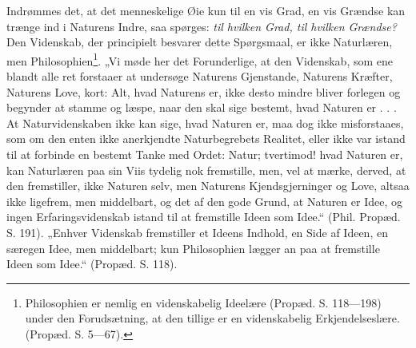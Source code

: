 \documentclass[11pt]{book}
\newcommand{\opage}[1]{\marginnote{\footnotesize\textit{[#1]}}}
\begin{document}
Indrømmes det, at det menneskelige Øie kun til en vis Grad, en vis
Grændse kan trænge ind i Naturens Indre, saa spørges: \emph{til hvilken
Grad, til hvilken Grændse?} Den Videnskab, der principielt besvarer
dette Spørgsmaal, er
\opage{289} \setcounter{footnote}{0}%
ikke Naturlæren, men Philosophien\footnote{%
Philosophien er nemlig en videnskabelig Ideelære (Propæd. S.
118---198) under den Forudsætning, at den tillige er en videnskabelig
Erkjendelseslære. (Propæd. S. 5---67).
}. „Vi møde her det Forunderlige, at den Videnskab, som ene blandt alle
ret forstaaer at undersøge Naturens Gjenstande, Naturens Kræfter,
Naturens Love, kort: Alt, hvad Naturens er, ikke desto mindre bliver
forlegen og begynder at stamme og læspe, naar den skal sige bestemt,
hvad Naturen er . . . At Naturvidenskaben ikke kan sige, hvad Naturen
er, maa dog ikke misforstaaes, som om den enten ikke anerkjendte
Naturbegrebets Realitet, eller ikke var istand til at forbinde en bestemt
Tanke med Ordet: Natur; tvertimod! hvad Naturen er, kan Naturlæren paa
sin Viis tydelig nok fremstille, men, vel at mærke, derved, at den
fremstiller, ikke Naturen selv, men Naturens Kjendsgjerninger og Love,
altsaa ikke ligefrem, men middelbart, og det af den gode Grund, at
Naturen er Idee, og ingen Erfaringsvidenskab istand til at fremstille
Ideen som Idee.“ (Phil. Propæd. S. 191). „Enhver Videnskab fremstiller
et Ideens Indhold, en Side af Ideen, en særegen Idee, men middelbart;
kun Philosophien lægger an paa at fremstille Ideen som Idee.“ (Propæd.
S. 118).
\end{document}
